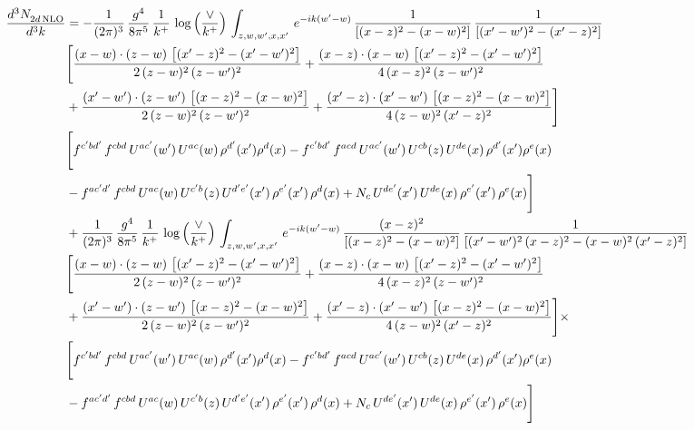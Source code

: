\documentclass[9pt]{article}
\numberwithin{equation}{section}
\begin{document}
\begin{align}
 \frac{d^{3}N_{2d\,\rm NLO}^{\rm}}{d^{3}k}  & =  -\frac{1}{(2\pi)^{3}}\, \frac{g^{4}}{8\pi^{5}}\,\frac{1}{k^{+}}\,\log{\left(\frac{\vee}{k^{+}}\right)}\,\int_{z,w,w^{\prime},x,x'}\, e^{-ik(w^{\prime}-w)}\,\frac{1}{\left[(x-z)^{2}-(x-w)^{2}\right]}\, \frac{1}{\left[(x'-w')^{2}-(x'-z)^{2}\right]}\notag \\ & \Bigg[\frac{(x-w)\cdot (z-w)\, \left[(x'-z)^{2}-(x'-w')^{2}\right]}{2\, (z-w)^{2}\, (z-w')^{2}}  + \frac{(x-z)\cdot (x-w)\,\left[(x'-z)^{2}-(x'-w')^{2}\right] }{4\,(x-z)^{2}\,(z-w')^{2}}\notag \\ & +\frac{(x'-w')\cdot (z-w')\, \left[(x-z)^{2}-(x-w)^{2}\right]}{2\, (z-w)^{2}\, (z-w')^{2}}+ \frac{(x'-z)\cdot (x'-w')\, \left[(x-z)^{2}-(x-w)^{2}\right]}{4\, (z-w)^{2}\,(x'-z)^{2}}\Bigg] \notag \\ &  \Bigg[f^{c'bd'}\,f^{cbd}\, U^{ac'}(w')\,U^{ac}(w)\,\rho^{d'}(x')\rho^{d}(x)- f^{c'bd'}\,f^{acd}\,U^{ac'}(w')\,U^{cb}(z)\,U^{de}(x)\,\rho^{d'}(x')\rho^{e}(x) \notag \\ & -f^{ac'd'}\,f^{cbd}\,U^{ac}(w)\,U^{c'b}(z)\,U^{d'e'}(x')\,\rho^{e'}(x')\,\rho^{d}(x) +N_{c}\,U^{de'}(x')\,U^{de}(x)\,\rho^{e'}(x')\,\rho^{e}(x)\Bigg]  \notag \\
& +\frac{1}{(2\pi)^{3}}\, \frac{g^{4}}{8\pi^{5}}\,\frac{1}{k^{+}}\,\log{\left(\frac{\vee}{k^{+}}\right)}\,\int_{z,w,w^{\prime},x,x'}\, e^{-ik(w^{\prime}-w)}\,\frac{(x-z)^{2}}{\left[(x-z)^{2}-(x-w)^{2}\right]}\,\frac{1}{\left[(x'-w')^{2}\,(x-z)^{2} - (x-w)^{2}\,(x'-z)^{2}\right]}\notag \\ & \Bigg[\frac{(x-w)\cdot (z-w)\, \left[(x'-z)^{2}-(x'-w')^{2}\right]}{2\, (z-w)^{2}\, (z-w')^{2}}  + \frac{(x-z)\cdot (x-w)\,\left[(x'-z)^{2}-(x'-w')^{2}\right] }{4\,(x-z)^{2}\,(z-w')^{2}}\notag \\ & +\frac{(x'-w')\cdot (z-w')\, \left[(x-z)^{2}-(x-w)^{2}\right]}{2\, (z-w)^{2}\, (z-w')^{2}}+ \frac{(x'-z)\cdot (x'-w')\, \left[(x-z)^{2}-(x-w)^{2}\right]}{4\, (z-w)^{2}\,(x'-z)^{2}}\Bigg]\times\,\notag \\ & \Bigg[f^{c'bd'}\,f^{cbd}\, U^{ac'}(w')\,U^{ac}(w)\,\rho^{d'}(x')\rho^{d}(x)- f^{c'bd'}\,f^{acd}\,U^{ac'}(w')\,U^{cb}(z)\,U^{de}(x)\,\rho^{d'}(x')\rho^{e}(x) \notag \\ & -f^{ac'd'}\,f^{cbd}\,U^{ac}(w)\,U^{c'b}(z)\,U^{d'e'}(x')\,\rho^{e'}(x')\,\rho^{d}(x) +N_{c}\,U^{de'}(x')\,U^{de}(x)\,\rho^{e'}(x')\,\rho^{e}(x)\Bigg] \notag \\

\end{align}
\end{document}
